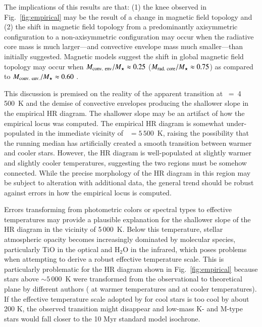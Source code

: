 \documentclass{aa}
\begin{document}
The implications of this results are that: (1) the knee observed in Fig.~\ref{fig:empirical} may be the result of a change in magnetic field topology and (2) the shift in magnetic field topology from a predominantly axisymmetric configuration to a non-axisymmetric configuration may occur when the radiative core mass is much larger---and convective envelope mass much smaller---than initially suggested. Magnetic models suggest the shift in global magnetic field topology may occur when $M_{\rm conv.\ env} / M_{\star} \approx 0.25$ ($M_{\rm rad.\ core} / M_{\star} \approx 0.75$) as compared to $M_{\rm conv.\ env.} / M_{\star} \approx 0.60$ \citep[$M_{\rm rad.\ core} / M_{\star} \approx 0.40$;][]{Gregory2012}.

This discussion is premised on the reality of the apparent transition at \teff~=~4\,500~K and the demise of convective envelopes producing the shallower slope in the empirical HR diagram. The shallower slope may be an artifact of how the empirical locus was computed. The empirical HR diagram is somewhat under-populated in the immediate vicinity of \teff~$= 5\,500$~K, raising the possibility that the running median has artificially created a smooth transition between warmer and cooler stars. However, the HR diagram is well-populated at slightly warmer and slightly cooler temperatures, suggesting the two regions must be somehow connected. While the precise morphology of the HR diagram in this region may be subject to alteration with additional data, the general trend should be robust against errors in how the empirical locus is computed.

Errors transforming from photometric colors or spectral types to effective temperatures may provide a plausible explanation for the shallower slope of the HR diagram in the vicinity of 5\,000~K. Below this temperature, stellar atmospheric opacity becomes increasingly dominated by molecular species, particularly TiO in the optical and H$_2$O in the infrared, which poses problems when attempting to derive a robust effective temperature scale. This is particularly problematic for the HR diagram shown in Fig.~\ref{fig:empirical} because stars above \teff$ \sim 5\,000$~K were transformed from the observational to theoretical plane by different authors (\citealt{Pecaut2012} at warmer temperatures and \citealt{Preibisch1999} at cooler temperatures). If the effective temperature scale adopted by \citet{Preibisch1999} for cool stars is too cool by about 200 K, the observed transition might disappear and low-mass K- and M-type stars would fall closer to the 10 Myr standard model isochrone.
\end{document}
